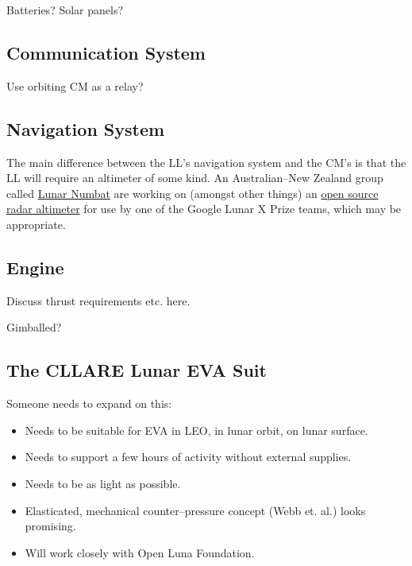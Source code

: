 \documentclass{report}
\begin{document}
Batteries?  Solar panels?

\subsection{Communication System}

Use orbiting CM as a relay?

\subsection{Navigation System}

The main difference between the LL's navigation system and the CM's is that the LL will require an altimeter of some kind.  An Australian--New Zealand group called \href{http://www.lunarnumbat.org}{Lunar Numbat} are working on (amongst other things) an \href{http://www.lunarnumbat.org/cgi-bin/twiki/view/LunarNumbat/LNTaskRadarAltimeter}{open source radar altimeter} for use by one of the Google Lunar X Prize teams, which may be appropriate.

\subsection{Engine}

Discuss thrust requirements etc. here.

Gimballed?

\subsection{The CLLARE Lunar EVA Suit}

Someone needs to expand on this:
\begin{itemize}
\item Needs to be suitable for EVA in LEO, in lunar orbit, on lunar surface.
\item Needs to support a few hours of activity without external supplies.
\item Needs to be as light as possible.
\item Elasticated, mechanical counter--pressure concept (Webb et. al.) looks promising.
\item Will work closely with Open Luna Foundation.
\end{itemize}
\end{document}
